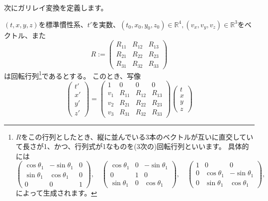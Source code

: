 次にガリレイ変換を定義します。
\begin{definition}[ガリレイ変換と慣性系]
  $(t,x,y,z)$を標準慣性系、$t'$を実数、$(t_0,x_0,y_0,z_0)\in\mathbb{R}^4, (v_x,v_y,v_z)\in\mathbb{R}^3$をベクトル、また
  \[
    R:=
    \begin{pmatrix}
      R_{11} & R_{12} & R_{13} \\
      R_{21} & R_{22} & R_{23} \\
      R_{31} & R_{32} & R_{33}
    \end{pmatrix}
  \]
  は回転行列\footnote{
    $R$をこの行列としたとき、縦に並んでいる3本のベクトルが互いに直交していて長さが1、かつ、行列式が1なものを(3次の)回転行列といいます。
    具体的には
    \[
      \begin{pmatrix}
        \cos\theta_1 & -\sin\theta_1 & 0 \\
        \sin\theta_1 & \cos\theta_1 & 0 \\
        0 & 0 & 1
      \end{pmatrix},\quad
      \begin{pmatrix}
        \cos\theta_1 & 0 & -\sin\theta_1 \\
        0 & 1 & 0 \\
        \sin\theta_1 & 0 & \cos\theta_1
      \end{pmatrix},\quad
      \begin{pmatrix}
        1 & 0 & 0 \\
        0 & \cos\theta_1 & -\sin\theta_1 \\
        0 & \sin\theta_1 & \cos\theta_1
      \end{pmatrix},\quad
    \]
    によって生成されます。
  }であるとする。
  このとき、写像
  \[
    \begin{pmatrix}
      t'\\x'\\y'\\z'
    \end{pmatrix}
    =
    \begin{pmatrix}
      1 & 0 & 0 & 0 \\
      v_1 & R_{11} & R_{12} & R_{13} \\
      v_2 & R_{21} & R_{22} & R_{23} \\
      v_3 & R_{31} & R_{32} & R_{33}
    \end{pmatrix}
    \begin{pmatrix}
      t\\x\\y\\z
    \end{pmatrix}
\]
\end{definition}
